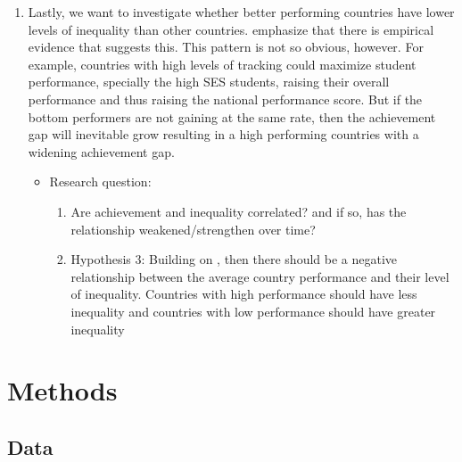 \begin{enumerate}
\begin{itemize}
\begin{enumerate}
\end{enumerate}
\end{itemize}

\item Lastly, we want to investigate whether better performing countries have lower levels of inequality than other countries. \citet{werfhorst_mijs} emphasize that there is empirical evidence that suggests this. This pattern is not so obvious, however. For example, countries with high levels of tracking could maximize student performance, specially the high SES students, raising their overall performance and thus raising the national performance score. But if the bottom performers are not gaining at the same rate, then the achievement gap will inevitable grow resulting in a high performing countries with a widening achievement gap.

\begin{itemize}
\item Research question:
\begin{enumerate}

\item Are achievement and inequality correlated? and if so, has the relationship weakened/strengthen over time?

\item Hypothesis 3: Building on \citet{werfhorst_mijs}, then there should be a negative relationship between the average country performance and their level of inequality. Countries with high performance should have less inequality and countries with low performance should have greater inequality

\end{enumerate}
\end{itemize}

\end{enumerate}

\section{Methods}
\subsection{Data}

